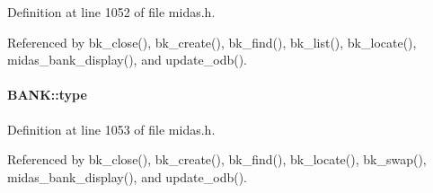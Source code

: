 \begin{DoxyItemize}
\item 
\end{DoxyItemize}

Definition at line 1052 of file midas.h.

Referenced by bk\_\-close(), bk\_\-create(), bk\_\-find(), bk\_\-list(), bk\_\-locate(), midas\_\-bank\_\-display(), and update\_\-odb().
\paragraph[{type}]{ {\bf BANK::type}}\hfill\label{structBANK_a91558478db8ed86d585715b8217ca72f}

\begin{DoxyItemize}
\item 
\end{DoxyItemize}

Definition at line 1053 of file midas.h.

Referenced by bk\_\-close(), bk\_\-create(), bk\_\-find(), bk\_\-locate(), bk\_\-swap(), midas\_\-bank\_\-display(), and update\_\-odb().